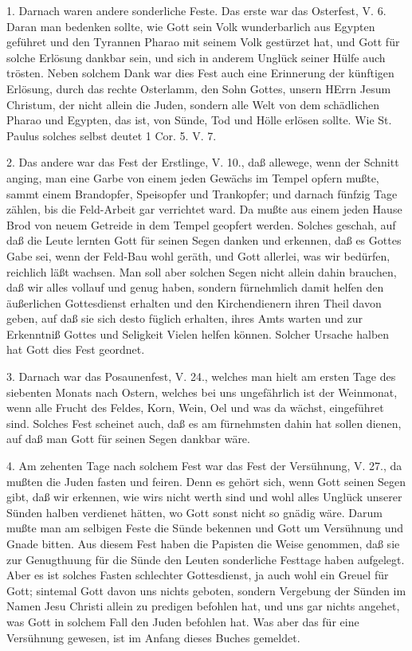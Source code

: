 1. Darnach waren andere sonderliche Feste. Das erste war das Osterfest, V. 6. Daran man bedenken sollte, wie Gott sein Volk wunderbarlich aus Egypten geführet und den Tyrannen Pharao mit seinem Volk gestürzet hat, und Gott für solche Erlösung dankbar sein, und sich in anderem Unglück seiner Hülfe auch trösten. Neben solchem Dank war dies Fest auch eine Erinnerung der künftigen Erlösung, durch das rechte Osterlamm, den Sohn Gottes, unsern HErrn Jesum Christum, der nicht allein die Juden, sondern alle Welt von dem schädlichen Pharao und Egypten, das ist, von Sünde, Tod und Hölle erlösen sollte. Wie St. Paulus solches selbst deutet 1 Cor. 5. V. 7.

2. Das andere war das Fest der Erstlinge, V. 10., daß allewege, wenn der Schnitt anging, man eine Garbe von einem jeden Gewächs im Tempel opfern mußte, sammt einem Brandopfer, Speisopfer und Trankopfer; und darnach fünfzig Tage zählen, bis die Feld-Arbeit gar verrichtet ward. Da mußte aus einem jeden Hause Brod von neuem Getreide in dem Tempel geopfert werden. Solches geschah, auf daß die Leute lernten Gott für seinen Segen danken und erkennen, daß es Gottes Gabe sei, wenn der Feld-Bau wohl geräth, und Gott allerlei, was wir bedürfen, reichlich läßt wachsen. Man soll aber solchen Segen nicht allein dahin brauchen, daß wir alles vollauf und genug haben, sondern fürnehmlich damit helfen den äußerlichen Gottesdienst erhalten und den Kirchendienern ihren Theil davon geben, auf daß sie sich desto füglich erhalten, ihres Amts warten und zur Erkenntniß Gottes und Seligkeit Vielen helfen können. Solcher Ursache halben hat Gott dies Fest geordnet.

3. Darnach war das Posaunenfest, V. 24., welches man hielt am ersten Tage des siebenten Monats nach Ostern, welches bei uns ungefährlich ist der Weinmonat, wenn alle Frucht des Feldes, Korn, Wein, Oel und was da wächst,
eingeführet sind. Solches Fest scheinet auch, daß es am fürnehmsten dahin hat sollen dienen, auf daß man Gott für seinen Segen dankbar wäre.

4. Am zehenten Tage nach solchem Fest war das Fest der Versühnung, V. 27., da mußten die Juden fasten und feiren. Denn es gehört sich, wenn Gott seinen Segen gibt, daß wir erkennen, wie wirs nicht werth sind und wohl alles Unglück unserer Sünden halben verdienet hätten, wo Gott sonst nicht so gnädig wäre. Darum mußte man am selbigen Feste die Sünde bekennen und Gott um Versühnung und Gnade bitten. Aus diesem Fest haben die Papisten die Weise genommen, daß sie zur Genugthuung für die Sünde den Leuten sonderliche Festtage haben aufgelegt. Aber es ist solches Fasten schlechter Gottesdienst, ja auch wohl ein Greuel für Gott; sintemal Gott davon uns nichts geboten, sondern Vergebung der Sünden im Namen Jesu Christi allein zu predigen befohlen hat, und uns gar nichts angehet, was Gott in solchem Fall den Juden befohlen hat. Was aber das für eine Versühnung gewesen, ist im Anfang dieses Buches gemeldet.

